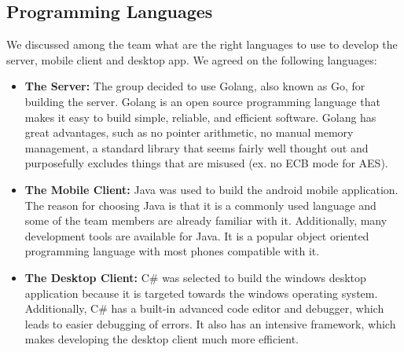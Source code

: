 \documentclass{article}
\begin{document}
\subsection{Programming Languages}
We discussed among the team what are the right languages to use to develop the server, mobile client and desktop app. We agreed on the following languages:
\begin{itemize}
\item\textbf{The Server:} The group decided to use Golang, also known as Go, for building the server. Golang is an open source programming language that makes it easy to build simple, reliable, and efficient software. Golang has great advantages, such as no pointer arithmetic, no manual memory management, a standard library that seems fairly well thought out and purposefully excludes things that are misused (ex. no ECB mode for AES).
\item\textbf{The Mobile Client:} Java was used to build the android mobile application. The reason for choosing Java is that it is a commonly used language and some of the team members are already familiar with it. Additionally, many development tools are available for Java. It is a popular object oriented programming language with most phones compatible with it.
\item\textbf{The Desktop Client:} C\# was selected to build the windows desktop application because it is targeted towards the windows operating system. Additionally, C\# has a built-in advanced code editor and debugger, which leads to easier debugging of errors. It also has an intensive framework, which makes developing the desktop client much more efficient.
\end{itemize}
\end{document}
